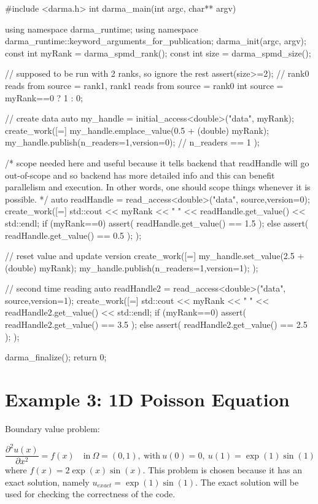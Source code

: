 \begin{CppCodeNumb}
#include <darma.h>
int darma_main(int argc, char** argv)
{
  using namespace darma_runtime; 
  using namespace darma_runtime::keyword_arguments_for_publication;
  darma_init(argc, argv);
  const int myRank = darma_spmd_rank();
  const int size = darma_spmd_size();

  // supposed to be run with 2 ranks, so ignore the rest
  assert(size>=2);
  // rank0 reads from source = rank1, rank1 reads from source = rank0 
  int source = myRank==0 ? 1 : 0;

  // create data
  auto my_handle = initial_access<double>("data", myRank);
  create_work([=]
  {
    my_handle.emplace_value(0.5 + (double) myRank);
    my_handle.publish(n_readers=1,version=0); // n_readers == 1
  });

  /* scope {} needed here and useful because it tells backend that 
     readHandle will go out-of-scope and so backend has more detailed 
     info and this can benefit parallelism and execution. 
     In other words, one should scope things whenever it is possible. */ 
  {
    auto readHandle = read_access<double>("data", source,version=0);
    create_work([=]
    {
      std::cout << myRank << " " << readHandle.get_value() << std::endl;
      if (myRank==0)
        assert( readHandle.get_value() == 1.5 );
      else
        assert( readHandle.get_value() == 0.5 );
    });
  }

  // reset value and update version
  create_work([=]
  {
    my_handle.set_value(2.5 + (double) myRank);
    my_handle.publish(n_readers=1,version=1);
  });

  // second time reading
  auto readHandle2 = read_access<double>("data", source,version=1);
  create_work([=]
  {
    std::cout << myRank << " " << readHandle2.get_value() << std::endl;
    if (myRank==0)
      assert( readHandle2.get_value() == 3.5 );
    else
      assert( readHandle2.get_value() == 2.5 );
  });

  darma_finalize();
  return 0;
}
\end{CppCodeNumb}





\section{Example 3: 1D Poisson Equation}

Boundary value problem:

\begin{equation} 
  \frac{\partial^2 u(x)}{\partial x^2} = f(x) \quad 
  \text{in} \ \Omega=(0,1), \ \text{with} 
  \ u(0)=0, \ u(1)=\exp{(1)}\sin{(1)}
\end{equation} 
where $f(x)=2\exp{(x)}\sin{(x)}$. This problem is chosen because 
it has an exact solution, namely $u_{exact} = \exp{(1)}\sin{(1)}$. 
The exact solution will be used for checking the correctness 
of the code.

